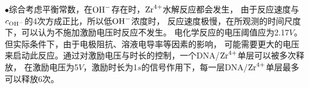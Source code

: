 \begin{summary}
$\bullet$综合考虑平衡常数，在$\ce{OH-}$存在时，$\ce{Zr^4+}$水解反应都会发生，
由于反应速度与$c_{\ce{OH-}}$的4次方成正比，所以低$\ce{OH-}$浓度时，
反应速度极慢，在所观测的时间尺度下，可以认为不施加激励电压时反应不发生。
电化学反应的电压阈值应为2.17$V$。但实际条件下，由于电极阻抗、溶液电导率等因素的影响，
可能需要更大的电压来启动此反应。通过对激励电压与时长的控制，一个DNA/$\ce{Zr^4+}$单层可以被多次释放，
在激励电压为5$V$，激励时长为1$s$的信号作用下，每一层DNA/$\ce{Zr^4+}$单层最多可以释放6次。


\end{summary}
